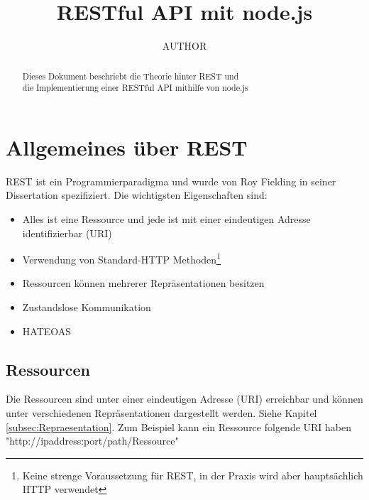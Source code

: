 \documentclass[listof=totoc]{article}
\title{RESTful API mit node.js}
\author{AUTHOR}
\begin{document}
	\maketitle
	\begin{abstract}
		\begin{center}
			Dieses Dokument beschriebt die Theorie hinter \ac{REST} und \\
			die Implementierung einer RESTful \ac{API} mithilfe von node.js
		\end{center}
	\end{abstract}
	\newpage
	
	\tableofcontents 
	\lstlistoflistings
	
	\newpage
	
	\section{Allgemeines über \ac{REST}}
	\ac{REST} ist ein Programmierparadigma und wurde von Roy Fielding in seiner Dissertation\cite{REST_THESIS} spezifiziert.
	\newline \newline
	Die wichtigsten Eigenschaften\cite[p.~2]{RESTBOOK} sind:
	\begin{itemize}  
		\item Alles ist eine Ressource und jede ist mit einer eindeutigen Adresse identifizierbar (\ac{URI})
		\item Verwendung von Standard-\ac{HTTP} Methoden\footnote{Keine strenge Voraussetzung für \ac{REST}, in der Praxis wird aber hauptsächlich \ac{HTTP} verwendet}
		\item Ressourcen können mehrerer Repräsentationen besitzen
		\item Zustandslose Kommunikation
		\item  \ac{HATEOAS}
	\end{itemize}
	\subsection{Ressourcen}
	Die Ressourcen sind unter einer eindeutigen Adresse (\ac{URI}) erreichbar und können unter verschiedenen Repräsentationen dargestellt werden. Siehe Kapitel \ref{subsec:Repraesentation}.
	\newline \newline
	Zum Beispiel kann ein Ressource folgende \ac{URI} haben "http://ipaddress:port/path/Ressource"
\end{document}
